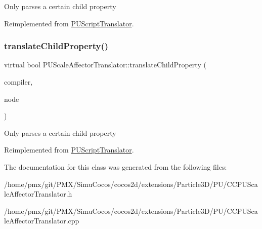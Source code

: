 Only parses a certain child property 

Reimplemented from \hyperlink{classPUScriptTranslator_a0374d83a8a04e57918975d525e0f8fe8}{P\+U\+Script\+Translator}.

\mbox{\label{classPUScaleAffectorTranslator_acb96dbcff6bc9be3ed04e455511b977c}} 
\subsubsection{\texorpdfstring{translate\+Child\+Property()}{translateChildProperty()}\hspace{0.1cm}{\footnotesize\ttfamily [2/2]}}
{\footnotesize\ttfamily virtual bool P\+U\+Scale\+Affector\+Translator\+::translate\+Child\+Property (\begin{DoxyParamCaption}\item[{\hyperlink{classPUScriptCompiler}{P\+U\+Script\+Compiler} $\ast$}]{compiler,  }\item[{\hyperlink{classPUAbstractNode}{P\+U\+Abstract\+Node} $\ast$}]{node }\end{DoxyParamCaption})\hspace{0.3cm}{\ttfamily [virtual]}}

Only parses a certain child property 

Reimplemented from \hyperlink{classPUScriptTranslator_a0374d83a8a04e57918975d525e0f8fe8}{P\+U\+Script\+Translator}.



The documentation for this class was generated from the following files\+:\begin{DoxyCompactItemize}
\item 
/home/pmx/git/\+P\+M\+X/\+Simu\+Cocos/cocos2d/extensions/\+Particle3\+D/\+P\+U/C\+C\+P\+U\+Scale\+Affector\+Translator.\+h\item 
/home/pmx/git/\+P\+M\+X/\+Simu\+Cocos/cocos2d/extensions/\+Particle3\+D/\+P\+U/C\+C\+P\+U\+Scale\+Affector\+Translator.\+cpp\end{DoxyCompactItemize}
